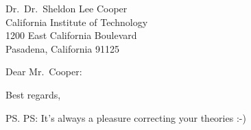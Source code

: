 \documentclass[english]{tumletter}
\begin{document}
\begin{letter}{Dr.\@~Dr.\@\ Sheldon Lee Cooper\\
    California Institute of Technology\\
    1200 East California Boulevard\\
    Pasadena, California 91125}

  \opening{Dear Mr.\@\ Cooper:}
  \lipsum[1-8]
  \closing{Best regards,}

  \ps PS: It's always a pleasure correcting your theories :-)
\end{letter}
\end{document}
